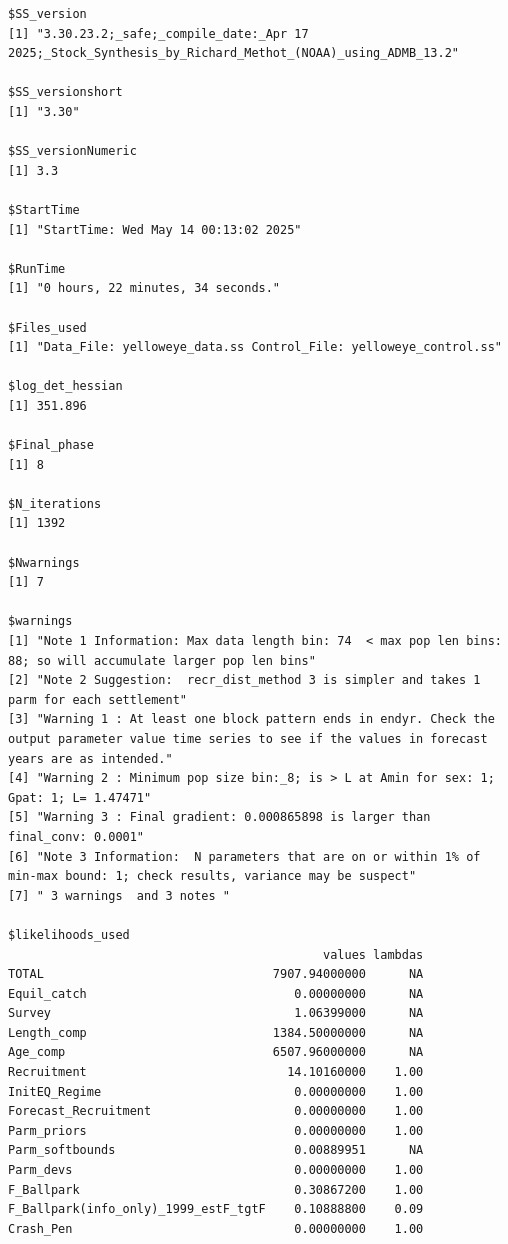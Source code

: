 \documentclass[
]{scrartcl}
\begin{document}
\begin{verbatim}
$SS_version
[1] "3.30.23.2;_safe;_compile_date:_Apr 17 2025;_Stock_Synthesis_by_Richard_Methot_(NOAA)_using_ADMB_13.2"

$SS_versionshort
[1] "3.30"

$SS_versionNumeric
[1] 3.3

$StartTime
[1] "StartTime: Wed May 14 00:13:02 2025"

$RunTime
[1] "0 hours, 22 minutes, 34 seconds."

$Files_used
[1] "Data_File: yelloweye_data.ss Control_File: yelloweye_control.ss"

$log_det_hessian
[1] 351.896

$Final_phase
[1] 8

$N_iterations
[1] 1392

$Nwarnings
[1] 7

$warnings
[1] "Note 1 Information: Max data length bin: 74  < max pop len bins: 88; so will accumulate larger pop len bins"                                               
[2] "Note 2 Suggestion:  recr_dist_method 3 is simpler and takes 1 parm for each settlement"                                                                    
[3] "Warning 1 : At least one block pattern ends in endyr. Check the output parameter value time series to see if the values in forecast years are as intended."
[4] "Warning 2 : Minimum pop size bin:_8; is > L at Amin for sex: 1; Gpat: 1; L= 1.47471"                                                                       
[5] "Warning 3 : Final gradient: 0.000865898 is larger than final_conv: 0.0001"                                                                                 
[6] "Note 3 Information:  N parameters that are on or within 1% of min-max bound: 1; check results, variance may be suspect"                                    
[7] " 3 warnings  and 3 notes "                                                                                                                                 

$likelihoods_used
                                            values lambdas
TOTAL                                7907.94000000      NA
Equil_catch                             0.00000000      NA
Survey                                  1.06399000      NA
Length_comp                          1384.50000000      NA
Age_comp                             6507.96000000      NA
Recruitment                            14.10160000    1.00
InitEQ_Regime                           0.00000000    1.00
Forecast_Recruitment                    0.00000000    1.00
Parm_priors                             0.00000000    1.00
Parm_softbounds                         0.00889951      NA
Parm_devs                               0.00000000    1.00
F_Ballpark                              0.30867200    1.00
F_Ballpark(info_only)_1999_estF_tgtF    0.10888800    0.09
Crash_Pen                               0.00000000    1.00


\end{verbatim}
\end{document}

